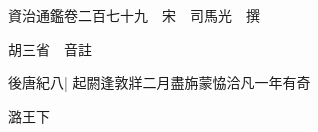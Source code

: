 






























































資治通鑑卷二百七十九　宋　司馬光　撰

胡三省　音註

後唐紀八|{
	起閼逢敦牂二月盡旃蒙恊洽凡一年有奇}


潞王下

